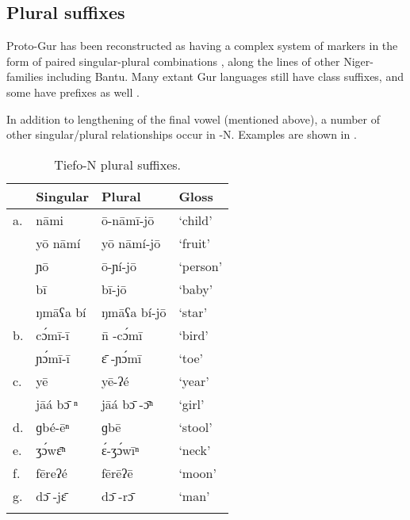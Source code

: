 \documentclass[output=paper,
modfonts
]{langscibook}
\begin{document}
\subsection{Plural suffixes}\label{sec:hangtan:3.2}

Proto-Gur has been reconstructed as having a complex system of  markers in the form of paired singular-plural combinations \citet{Naden1989}, along the lines of other Niger- families including Bantu. Many extant Gur languages still have class suffixes, and some have prefixes as well \citep{MieheEtAl2012}.

In addition to lengthening of the final vowel (mentioned above), a number of other singular/plural relationships occur in -N. Examples are shown in .


\begin{table}
\caption{Tiefo-N plural suffixes.}
\label{tab:hangtan:4}
\begin{tabularx}{\textwidth}{lXXX}
\lsptoprule
 & {\bfseries Singular} & {\bfseries Plural} & {\bfseries Gloss}\\
\midrule
{ a.} & { nāmi} & { \=o-nāmī-j\=o} & { ‘child’}\\
& { y\=o nāmí} & { y\=o nāmí-j\=o} & { ‘fruit’}\\
& { ɲ\=o} & { \=o-ɲí-j\=o} & { ‘person’}\\
& { bī} & { bī-j\=o} & { ‘baby’}\\
& { ŋmāʕa bí} & { ŋmāʕa bí-j\=o} & { ‘star’}\\
\tablevspace
{ b.} & { c{\'{ɔ}}mī-ī} & { \={n} {}-c{\'{ɔ}}mī} & { ‘bird’}\\
& { ɲ{\'{ɔ}}mī-ī} & { \={ɛ} {{}-ɲ}{}{\'{ɔ}}{mī}} & { ‘toe’}\\
\tablevspace
{ c.} & { yē} & { yē-ʔé} & { ‘year’}\\
& { {jāá} {b}\={ɔ} {ⁿ}} & { {jāá} {b}\={ɔ} {{}-}\={ɔ}{ⁿ}} & { ‘girl’}\\
\tablevspace
{ d.} & { ɡbé-ēⁿ} & { ɡbē} & { ‘stool’}\\
\tablevspace
{ e.} & { {ʒ}{}{\'{ɔ}}{w}\={ɛ}{ⁿ}} & { \'{ɛ}{}-ʒ{\'{ɔ}}wīⁿ} & { ‘neck’}\\
\tablevspace
{ f.} & { fēreʔé} & { fērēʔē} & { ‘moon’}\\
\tablevspace
{ g.} & { {d}\={ɔ} {{}-j}\={ɛ}} & { {d}\={ɔ} {{}-r}\={ɔ}} & { ‘man’}\\
\lspbottomrule
\end{tabularx}

\end{table}
\end{document}
